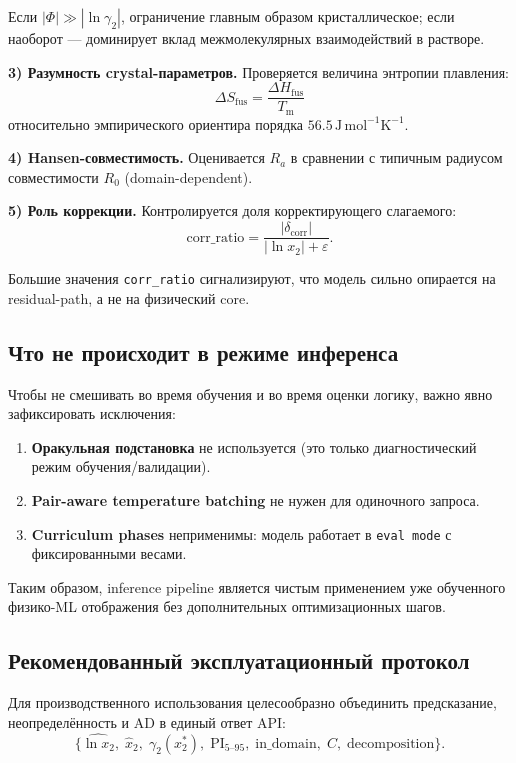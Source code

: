 \documentclass[11pt]{article}
\begin{document}
Если $|\Phi|\gg|\ln\gamma_2|$, ограничение главным образом кристаллическое; если наоборот --- доминирует вклад межмолекулярных взаимодействий в растворе.

\textbf{3) Разумность crystal-параметров.}
Проверяется величина энтропии плавления:
\begin{equation*}
\Delta S_{\mathrm{fus}} = \frac{\Delta H_{\mathrm{fus}}}{T_{\mathrm{m}}}
\end{equation*}
относительно эмпирического ориентира порядка $56.5\,\mathrm{J\,mol^{-1}K^{-1}}$.

\textbf{4) Hansen-совместимость.}
Оценивается $R_a$ в сравнении с типичным радиусом совместимости $R_0$ (domain-dependent).

\textbf{5) Роль коррекции.}
Контролируется доля корректирующего слагаемого:
\begin{equation*}
\mathrm{corr\_ratio} = \frac{|\delta_{\mathrm{corr}}|}{|\ln x_2|+\varepsilon}.
\end{equation*}

Большие значения \texttt{corr\_ratio} сигнализируют, что модель сильно опирается на residual-path, а не на физический core.

\subsection{Что не происходит в режиме инференса}

Чтобы не смешивать во время обучения и во время оценки логику, важно явно зафиксировать исключения:
\begin{enumerate}
  \item \textbf{Оракульная подстановка} не используется (это только диагностический режим обучения/валидации).
  \item \textbf{Pair-aware temperature batching} не нужен для одиночного запроса.
  \item \textbf{Curriculum phases} неприменимы: модель работает в \texttt{eval mode} с фиксированными весами.
\end{enumerate}

Таким образом, inference pipeline является чистым применением уже обученного физико-ML отображения без дополнительных оптимизационных шагов.

\subsection{Рекомендованный эксплуатационный протокол}

Для производственного использования целесообразно объединить предсказание, неопределённость и AD в единый ответ API:
\begin{equation*}
\{\hat{\ln x_2},\; \hat{x}_2,\; \gamma_2(x_2^{*}),\; \mathrm{PI}_{5\text{--}95},\; \mathrm{in\_domain},\; C,\; \text{decomposition}\}.
\end{equation*}
\end{document}
